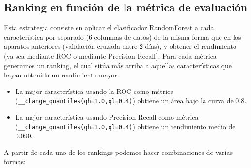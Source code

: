 \documentclass[a4paper,12pt,twoside,oldfontcommands]{memoir}
\begin{document}
\subsection{Ranking en función de la métrica de evaluación}
Esta estrategia consiste en aplicar el clasificador RandomForest a cada característica por separado (6 columnas de datos) de la misma forma que en los aparatos anteriores (validación cruzada entre 2 días), y obtener el rendimiento (ya sea mediante ROC o mediante Precision-Recall). Para cada métrica generamos un ranking, el cual sitúa más arriba a aquellas características que hayan obtenido un rendimiento mayor. 

\begin{itemize}
    \item La mejor característica usando la ROC como métrica (\texttt{\_\_change\_quantiles(qh=1.0,ql=0.4)}) obtiene un área bajo la curva de 0.8. 
    \item La mejor característica usando Precision-Recall como métrica (\texttt{\_\_change\_quantiles(qh=1.0,ql=0.4)}) obtiene un rendimiento medio de 0.099. 
\end{itemize}

A partir de cada uno de los rankings podemos hacer combinaciones de varias formas: 
\end{document}
